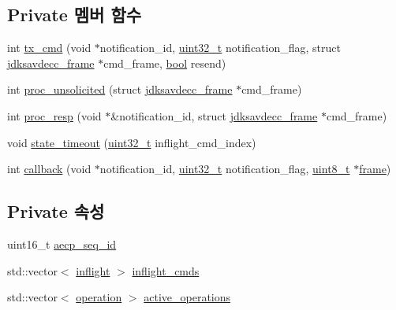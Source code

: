 \subsection*{Private 멤버 함수}
\begin{DoxyCompactItemize}
\item 
int \hyperlink{classavdecc__lib_1_1aecp__controller__state__machine_a1a1c2c9ae3773c01cbad352f2a2c2dfc}{tx\+\_\+cmd} (void $\ast$notification\+\_\+id, \hyperlink{parse_8c_a6eb1e68cc391dd753bc8ce896dbb8315}{uint32\+\_\+t} notification\+\_\+flag, struct \hyperlink{structjdksavdecc__frame}{jdksavdecc\+\_\+frame} $\ast$cmd\+\_\+frame, \hyperlink{avb__gptp_8h_af6a258d8f3ee5206d682d799316314b1}{bool} resend)
\item 
int \hyperlink{classavdecc__lib_1_1aecp__controller__state__machine_ab9bb717d50b960910aa54219117fb0be}{proc\+\_\+unsolicited} (struct \hyperlink{structjdksavdecc__frame}{jdksavdecc\+\_\+frame} $\ast$cmd\+\_\+frame)
\item 
int \hyperlink{classavdecc__lib_1_1aecp__controller__state__machine_a81d345252361d6b1650316379916ccf6}{proc\+\_\+resp} (void $\ast$\&notification\+\_\+id, struct \hyperlink{structjdksavdecc__frame}{jdksavdecc\+\_\+frame} $\ast$cmd\+\_\+frame)
\item 
void \hyperlink{classavdecc__lib_1_1aecp__controller__state__machine_a1e6e8844609ddaee9d544e95210c495c}{state\+\_\+timeout} (\hyperlink{parse_8c_a6eb1e68cc391dd753bc8ce896dbb8315}{uint32\+\_\+t} inflight\+\_\+cmd\+\_\+index)
\item 
int \hyperlink{classavdecc__lib_1_1aecp__controller__state__machine_a5803ae7099ff1a9c0721244e3d9b77b4}{callback} (void $\ast$notification\+\_\+id, \hyperlink{parse_8c_a6eb1e68cc391dd753bc8ce896dbb8315}{uint32\+\_\+t} notification\+\_\+flag, \hyperlink{stdint_8h_aba7bc1797add20fe3efdf37ced1182c5}{uint8\+\_\+t} $\ast$\hyperlink{gst__avb__playbin_8c_ac8e710e0b5e994c0545d75d69868c6f0}{frame})
\end{DoxyCompactItemize}
\subsection*{Private 속성}
\begin{DoxyCompactItemize}
\item 
uint16\+\_\+t \hyperlink{classavdecc__lib_1_1aecp__controller__state__machine_a739c0b970efa6070e274e47060b7aa55}{aecp\+\_\+seq\+\_\+id}
\item 
std\+::vector$<$ \hyperlink{classavdecc__lib_1_1inflight}{inflight} $>$ \hyperlink{classavdecc__lib_1_1aecp__controller__state__machine_a0475b054c1890c88809394d9cef2a4c0}{inflight\+\_\+cmds}
\item 
std\+::vector$<$ \hyperlink{classavdecc__lib_1_1operation}{operation} $>$ \hyperlink{classavdecc__lib_1_1aecp__controller__state__machine_af657d138a724d9d35eb351f24aaf0b8a}{active\+\_\+operations}
\end{DoxyCompactItemize}



